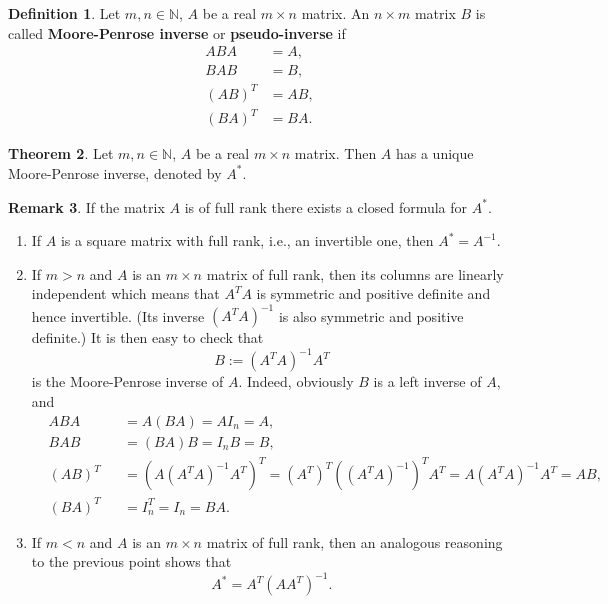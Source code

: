 \documentclass[fleqn]{article}
\theoremstyle{definition}
\newtheorem{theorem}{Theorem}[section]
\newtheorem{definition}[theorem]{Definition}
\newtheorem{remark}[theorem]{Remark}
\newcommand{\N}{\mathbb{N}}
\begin{document}
\begin{definition}
  Let $m, n \in \N$, $A$ be a real $m \times n$ matrix.
  An $n \times m$ matrix $B$ is called \textbf{Moore-Penrose inverse} or
  \textbf{pseudo-inverse} if
  \begin{subequations}
    \begin{align}
      A B A & = A, \\
      B A B & = B, \\
      (A B)^T & = A B, \\
      (B A)^T & = B A.
    \end{align}
  \end{subequations}
\end{definition}

\begin{theorem}
  Let $m, n \in \N$, $A$ be a real $m \times n$ matrix.
  Then $A$ has a unique Moore-Penrose inverse, denoted by $A^*$.
\end{theorem}

\begin{remark}
  If the matrix $A$ is of full rank there exists a closed formula for $A^*$.
  \begin{enumerate}
    \item
      If $A$ is a square matrix with full rank, i.e., an invertible one, then
      $A^* = A^{-1}$.
    \item
      If $m > n$ and $A$ is an $m \times n$ matrix of full rank, then its
      columns are linearly independent which means that $A^T A$ is
      symmetric and positive definite and hence invertible.
      (Its inverse $(A^T A)^{-1}$ is also symmetric and positive definite.)
      It is then easy to check that
      \begin{equation}
        B := (A^T A)^{-1} A^T
      \end{equation}
      is the Moore-Penrose inverse of $A$.
      Indeed, obviously $B$ is a left inverse of $A$, and 
      \begin{subequations}
        \begin{alignat}{2}
          & A B A && = A (B A) = A I_n = A, \\
          & B A B && = (B A) B = I_n B = B, \\
          & (A B)^T && = (A (A^T A)^{-1} A^T)^T
            = (A^T)^T ((A^T A)^{-1})^T A^T = A (A^T A)^{-1} A^T = A B, \\
          & (B A)^T && = I_n^T = I_n = B A.
        \end{alignat}
      \end{subequations}
    \item
      If $m < n$ and $A$ is an $m \times n$ matrix of full rank, then an
      analogous reasoning to the previous point shows that
      \begin{equation}
        A^* = A^T (A A^T)^{-1}.
      \end{equation}
  \end{enumerate}
\end{remark}
\end{document}
